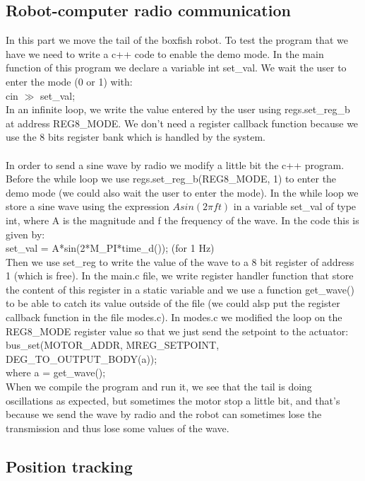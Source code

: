 \documentclass[11pt]{article}
\begin{document}
\subsection{Robot-computer radio communication}

In this part we move the tail of the boxfish robot. To test the program that we have we need to write a c++ code to enable the demo mode. In the main function of this program we declare a variable int set\_val. We wait the user to enter the mode (0 or 1) with:
\\
cin $\gg$ set\_val;
\\
In an infinite loop, we write the value entered by the user using regs.set\_reg\_b at address REG8\_MODE. We don't need a register callback function because we use the 8 bits register bank which is handled by the system.
\\
\\
In order to send a sine wave by radio we modify a little bit the c++ program. Before the while loop we use regs.set\_reg\_b(REG8\_MODE, 1) to enter the demo mode (we could also wait the user to enter the mode). In the while loop we store a sine wave using the expression ${Asin(2{\pi}ft)}$ in a variable set\_val of type int, where A is the magnitude and f the frequency of the wave. In the code this is given by:
\\
set\_val = A*sin(2*M\_PI*time\_d()); (for 1 Hz)
\\
Then we use set\_reg to write the value of the wave to a 8 bit register of address 1 (which is free). In the main.c file, we write register handler function that store the content of this register in a static variable and we use a function get\_wave() to be able to catch its value outside of the file (we could alsp put the register callback function in the file modes.c). In modes.c we modified the loop on the REG8\_MODE register value so that we just send the setpoint to the actuator:
\\
bus\_set(MOTOR\_ADDR, MREG\_SETPOINT, DEG\_TO\_OUTPUT\_BODY(a));
\\
where a = get\_wave();
\\
When we compile the program and run it, we see that the tail is doing oscillations as expected, but sometimes the motor stop a little bit, and that's because we send the wave by radio and the robot can sometimes lose the transmission and thus lose some values of the wave.


\subsection{Position tracking}
\end{document}
